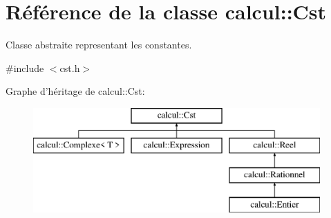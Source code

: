 \hypertarget{classcalcul_1_1_cst}{\section{Référence de la classe calcul\-:\-:Cst}
\label{classcalcul_1_1_cst}
}


Classe abstraite representant les constantes.  




{\ttfamily \#include $<$cst.\-h$>$}

Graphe d'héritage de calcul\-:\-:Cst\-:\begin{figure}[H]
\begin{center}
\leavevmode
\includegraphics[height=4.000000cm]{classcalcul_1_1_cst}
\end{center}
\end{figure}

